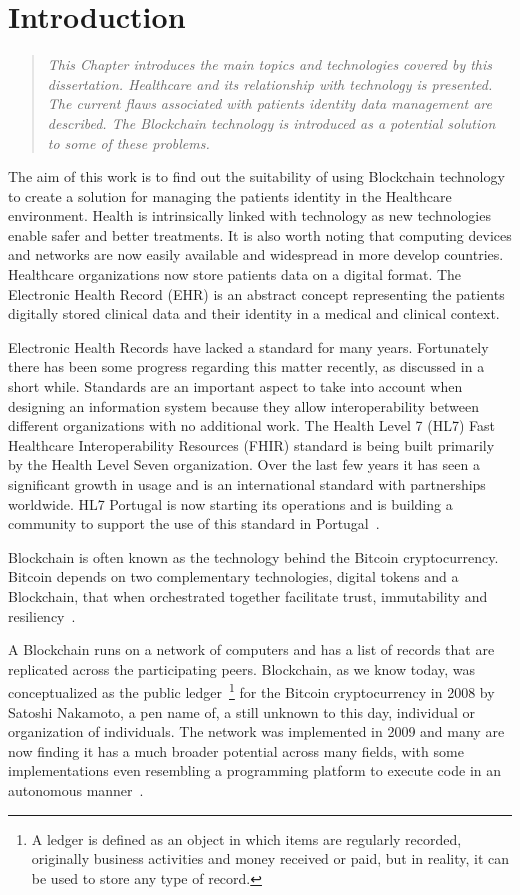 \chapter{Introduction}
\label{introduction}

\begin{quote} 
  \emph{This Chapter introduces the main topics and technologies covered by this dissertation. Healthcare and its relationship with technology is presented. The current flaws associated with patients identity data management are described. The Blockchain technology is introduced as a potential solution to some of these problems.} 
\end{quote}

The aim of this work is to find out the suitability of using Blockchain technology to create a solution for managing the patients identity in the Healthcare environment.
Health is intrinsically linked with technology as new technologies enable safer
and better treatments. It is also worth noting that computing devices and
networks are now easily available and widespread in more develop countries.
Healthcare organizations now store patients data on a digital format. The
Electronic Health Record (EHR) is an abstract concept representing the patients
digitally stored clinical data and their identity in a medical and clinical
context.

Electronic Health Records  have lacked a standard for many years. Fortunately
there has been some progress regarding this matter recently, as discussed in a
short while.  Standards are an important aspect to take into account when
designing an information system because they allow interoperability between
different organizations with no additional work. The Health Level 7 (HL7) Fast
Healthcare Interoperability Resources (FHIR) standard is being built primarily
by the Health Level Seven organization. Over the last few years it has seen a
significant growth in usage and is an international standard with partnerships
worldwide. HL7 Portugal is now starting its operations and is building a
community to support the use of this standard in Portugal~\cite{HealthLevel7}.

Blockchain is often known as the technology behind the Bitcoin cryptocurrency.
Bitcoin depends on two complementary technologies, digital tokens and a
Blockchain, that when orchestrated together facilitate trust, immutability and
resiliency~\cite{Evans2016}.

A Blockchain runs on a network of computers and has a list of records that are
replicated across the participating peers. Blockchain, as we know today, was
conceptualized as the public ledger~\footnote{A ledger is defined as an object
in which items are regularly recorded, originally business activities and money
received or paid, but in reality, it can be used to store any type of record.}
for the Bitcoin cryptocurrency in 2008 by Satoshi Nakamoto, a pen name of, a
still unknown to this day, individual or organization of individuals. The
network was implemented in 2009 and many are now finding it has a much broader
potential across many fields, with some implementations even resembling a
programming platform to execute code in an autonomous
manner~\cite{Nakamoto2008}.

